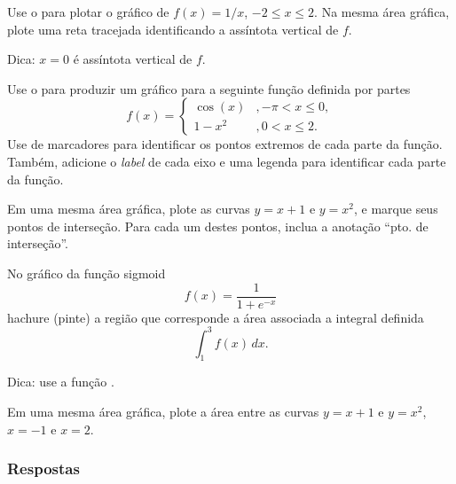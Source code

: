 \begin{exer}
  Use o {\matplotlib} para plotar o gráfico de $f(x) = 1/x$, $-2 \leq x \leq 2$. Na mesma área gráfica, plote uma reta tracejada identificando a assíntota vertical de $f$.
\end{exer}
\begin{resp}
  Dica: $x = 0$ é assíntota vertical de $f$.
\end{resp}

\begin{exer}
  Use o {\matplotlib} para produzir um gráfico para a seguinte função definida por partes
  \begin{equation}
    f(x) = \left\{
      \begin{array}{ll}
        \cos(x) &, -\pi < x \leq 0,\\
        1-x^2 &, 0 < x \leq 2.
      \end{array}
    \right.
  \end{equation}
  Use de marcadores para identificar os pontos extremos de cada parte da função. Também, adicione o \textit{label} de cada eixo e uma legenda para identificar cada parte da função.
\end{exer}

\begin{exer}
  Em uma mesma área gráfica, plote as curvas $y = x + 1$ e $y = x^2$, e marque seus pontos de interseção. Para cada um destes pontos, inclua a anotação ``pto. de interseção''.
\end{exer}

\begin{exer}
  No gráfico da função sigmoid
  \begin{equation}
    f(x) = \frac{1}{1 + e^{-x}}
  \end{equation}
  hachure (pinte) a região que corresponde a área associada a integral definida
  \begin{equation}
    \int_1^3 f(x)\,dx.
  \end{equation}
\end{exer}
\begin{resp}
  Dica: use a função {\PYTHONmatplotlibDOTaxesDOTAxesDOTfillBetween}.
\end{resp}

\begin{ex}
  Em uma mesma área gráfica, plote a área entre as curvas $y = x + 1$ e $y = x^2$, $x=-1$ e $x=2$.
\end{ex}

\ifisbook
\subsubsection{Respostas}
\shipoutAnswer
\fi

